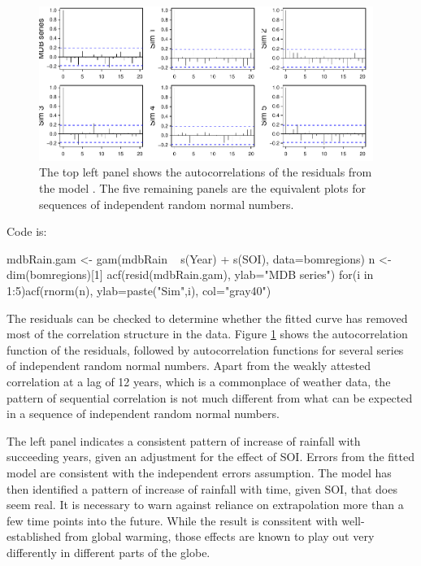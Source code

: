 \begin{figure}
\begin{Schunk}


\centerline{\includegraphics[width=0.97\textwidth]{figs/12-ar1sims-1} }

\end{Schunk}
\caption{The top left panel shows the autocorrelations of the
  residuals from the model .  The five remaining
  panels are the equivalent plots for sequences of independent random
  normal numbers.}\label{fig:ar1sims}
\end{figure}

Code is:
\begin{Schunk}
\begin{Sinput}
mdbRain.gam <- gam(mdbRain ~ s(Year) + s(SOI),
                   data=bomregions)
n <-  dim(bomregions)[1]
acf(resid(mdbRain.gam), ylab="MDB series")
for(i in 1:5)acf(rnorm(n), ylab=paste("Sim",i),
                 col="gray40")
\end{Sinput}
\end{Schunk}

The residuals can be checked to determine whether the fitted curve
has removed most of the correlation structure in the data.
Figure \ref{fig:ar1sims} shows the autocorrelation function of the
residuals, followed by autocorrelation functions for several series of
independent random normal numbers.  Apart from the weakly attested
correlation at a lag of 12 years, which is a commonplace of weather
data, the pattern of sequential correlation is not much different from
what can be expected in a sequence of independent random normal
numbers.

The left panel indicates a consistent pattern of increase of rainfall
with succeeding years, given an adjustment for the effect of SOI.
Errors from the fitted model are consistent with the independent
errors assumption.  The model has then identified a pattern of
increase of rainfall with time, given SOI, that does seem real.  It is
necessary to warn against reliance on extrapolation more than a few
time points into the future. While the result is conssitent with
well-established from global warming, those effects are known to play
out very differently in different parts of the globe.


